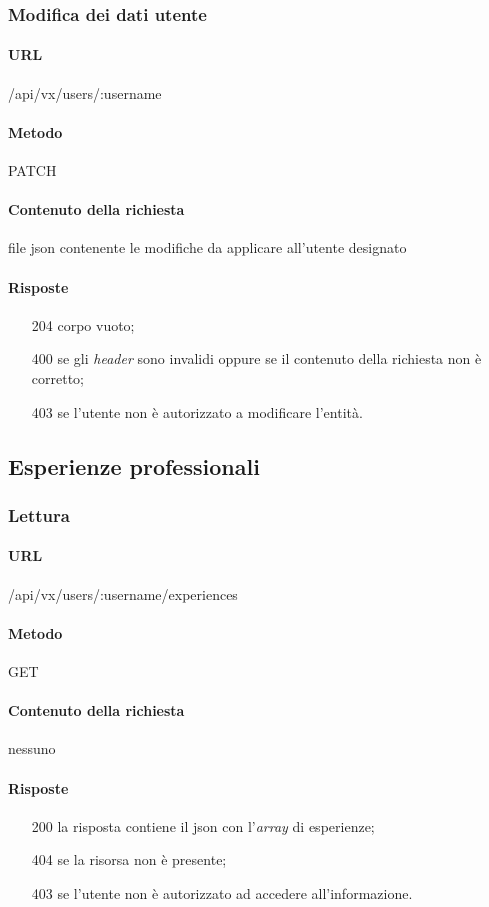 \subsubsection{Modifica dei dati utente}
\paragraph{URL}
/api/vx/users/:username
\paragraph{Metodo}
PATCH
\paragraph{Contenuto della richiesta}
file \gls{json} contenente le modifiche da applicare all'utente designato
\paragraph{Risposte}
\begin{itemize}
	\item[204] corpo vuoto;
	\item[400] se gli \emph{header} sono invalidi oppure se il contenuto della richiesta non è corretto;
	\item[403] se l'utente non è autorizzato a modificare l'entità.
\end{itemize}

\subsection{Esperienze professionali}

\subsubsection{Lettura}
\paragraph{URL}
/api/vx/users/:username/experiences
\paragraph{Metodo}
GET
\paragraph{Contenuto della richiesta}
nessuno
\paragraph{Risposte}
\begin{itemize}
	\item[200] la risposta contiene il \gls{json} con l'\emph{array} di esperienze;
	\item[404] se la risorsa non è presente;
	\item[403] se l'utente non è autorizzato ad accedere all'informazione.
\end{itemize}



